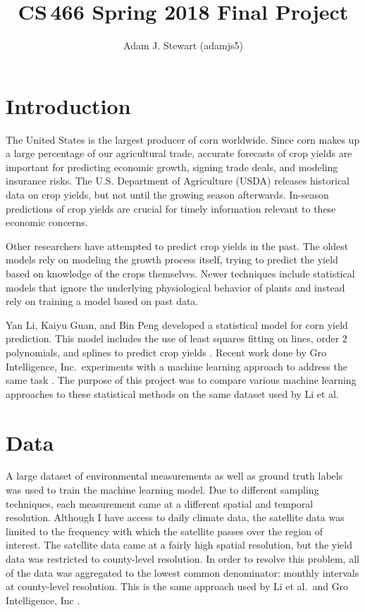 \documentclass[letterpaper]{article}
\begin{document}
\title{CS\,466 Spring 2018 Final Project}
\author{Adam J. Stewart (adamjs5)}

\maketitle

\section{Introduction}

The United States is the largest producer of corn worldwide. Since corn makes up a large percentage of our agricultural trade, accurate forecasts of crop yields are important for predicting economic growth, signing trade deals, and modeling insurance risks. The U.S. Department of Agriculture (USDA) releases historical data on crop yields, but not until the growing season afterwards. In-season predictions of crop yields are crucial for timely information relevant to these economic concerns.

Other researchers have attempted to predict crop yields in the past. The oldest models rely on modeling the growth process itself, trying to predict the yield based on knowledge of the crops themselves. Newer techniques include statistical models that ignore the underlying physiological behavior of plants and instead rely on training a model based on past data.

Yan Li, Kaiyu Guan, and Bin Peng developed a statistical model for corn yield prediction. This model includes the use of least squares fitting on lines, order 2 polynomials, and splines to predict crop yields \cite{li18}. Recent work done by Gro Intelligence, Inc.\ experiments with a machine learning approach to address the same task \cite{cai18}. The purpose of this project was to compare various machine learning approaches to these statistical methods on the same dataset used by Li et al.

\section{Data}

A large dataset of environmental measurements as well as ground truth labels was used to train the machine learning model. Due to different sampling techniques, each measurement came at a different spatial and temporal resolution. Although I have access to daily climate data, the satellite data was limited to the frequency with which the satellite passes over the region of interest. The satellite data came at a fairly high spatial resolution, but the yield data was restricted to county-level resolution. In order to resolve this problem, all of the data was aggregated to the lowest common denominator: monthly intervals at county-level resolution. This is the same approach used by Li et al.\ and Gro Intelligence, Inc \cite{li18,cai18}.
\end{document}

